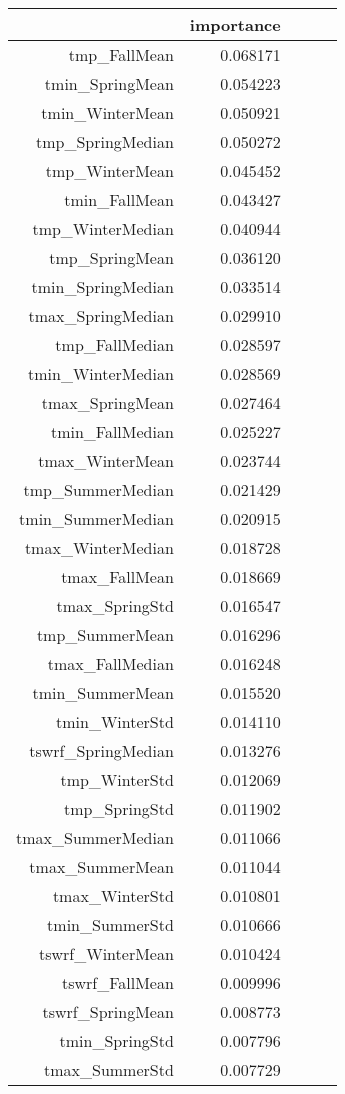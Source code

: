 \begin{tabular}{rrrrr}
\toprule
 & importance \\
\midrule
tmp_FallMean & 0.068171 \\
tmin_SpringMean & 0.054223 \\
tmin_WinterMean & 0.050921 \\
tmp_SpringMedian & 0.050272 \\
tmp_WinterMean & 0.045452 \\
tmin_FallMean & 0.043427 \\
tmp_WinterMedian & 0.040944 \\
tmp_SpringMean & 0.036120 \\
tmin_SpringMedian & 0.033514 \\
tmax_SpringMedian & 0.029910 \\
tmp_FallMedian & 0.028597 \\
tmin_WinterMedian & 0.028569 \\
tmax_SpringMean & 0.027464 \\
tmin_FallMedian & 0.025227 \\
tmax_WinterMean & 0.023744 \\
tmp_SummerMedian & 0.021429 \\
tmin_SummerMedian & 0.020915 \\
tmax_WinterMedian & 0.018728 \\
tmax_FallMean & 0.018669 \\
tmax_SpringStd & 0.016547 \\
tmp_SummerMean & 0.016296 \\
tmax_FallMedian & 0.016248 \\
tmin_SummerMean & 0.015520 \\
tmin_WinterStd & 0.014110 \\
tswrf_SpringMedian & 0.013276 \\
tmp_WinterStd & 0.012069 \\
tmp_SpringStd & 0.011902 \\
tmax_SummerMedian & 0.011066 \\
tmax_SummerMean & 0.011044 \\
tmax_WinterStd & 0.010801 \\
tmin_SummerStd & 0.010666 \\
tswrf_WinterMean & 0.010424 \\
tswrf_FallMean & 0.009996 \\
tswrf_SpringMean & 0.008773 \\
tmin_SpringStd & 0.007796 \\
tmax_SummerStd & 0.007729 \\

\end{tabular}
